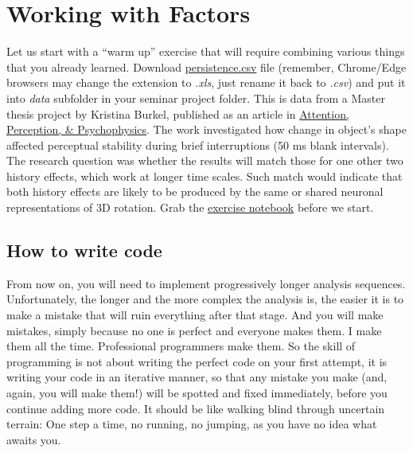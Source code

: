 \documentclass[
]{book}
\begin{document}
\hypertarget{working-with-factors}{%
\chapter{Working with Factors}\label{working-with-factors}}

Let us start with a ``warm up'' exercise that will require combining various things that you already learned. Download \href{data/persistence.csv}{persistence.csv} file (remember, Chrome/Edge browsers may change the extension to \emph{.xls}, just rename it back to \emph{.csv}) and put it into \emph{data} subfolder in your seminar project folder. This is data from a Master thesis project by Kristina Burkel, published as an article in \href{http://link.springer.com/10.3758/s13414-019-01954-7}{Attention, Perception, \& Psychophysics}. The work investigated how change in object's shape affected perceptual stability during brief interruptions (50 ms blank intervals). The research question was whether the results will match those for one other two history effects, which work at longer time scales. Such match would indicate that both history effects are likely to be produced by the same or shared neuronal representations of 3D rotation. Grab the \href{notebooks/Seminar\%2007\%20-\%20factors.Rmd}{exercise notebook} before we start.

\hypertarget{how-to-write-code}{%
\section{How to write code}\label{how-to-write-code}}

From now on, you will need to implement progressively longer analysis sequences. Unfortunately, the longer and the more complex the analysis is, the easier it is to make a mistake that will ruin everything after that stage. And you will make mistakes, simply because no one is perfect and everyone makes them. I make them all the time. Professional programmers make them. So the skill of programming is not about writing the perfect code on your first attempt, it is writing your code in an iterative manner, so that any mistake you make (and, again, you will make them!) will be spotted and fixed immediately, before you continue adding more code. It should be like walking blind through uncertain terrain: One step a time, no running, no jumping, as you have no idea what awaits you.
\end{document}
